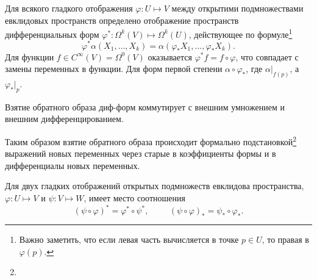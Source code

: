 \begin{to_def} 
    Для всякого гладкого отображения $\varphi \colon U \mapsto V$ между открытими подмножествами евклидовых пространств определено отображение пространств дифференциальных форм $\varphi^* \colon \Omega^k(V) \mapsto \Omega^k (U)$, действующее по формуле\footnote{
        Важно заметить, что если левая часть вычисляется в точке $p \in U$, то правая в $\varphi(p)$.
    }
\begin{equation*}
    \varphi^* \alpha (X_1, \ldots, X_k) = \alpha(\varphi_* X_1,\ldots,\varphi_* X_k).
\end{equation*}
Для функции $f \in C^{\infty}(V) = \Omega^0 (V)$ оказывается $\varphi^* f = f \circ \varphi$, что совпадает с замены переменных в функции. Для форм первой степени $\alpha \circ \varphi_*$, где $\alpha|_{f(p)}$, а $\varphi_*|_p$.
\end{to_def}

\begin{to_lem} 
    Взятие обратного образа диф-форм коммутирует с внешним умножением и внешним дифференцированием.  
\end{to_lem}


Таким образом взятие обратного образа происходит формально подстановкой\footnote{
} выражений новых переменных через старые в коэффициенты формы и в дифференциалы новых переменных.


\begin{to_tas} 
\label{task_6.97}
    Для двух гладких отображений открытых подмножеств евклидова пространства, $\varphi \colon U \mapsto V$ и $\psi \colon V \mapsto W$, имеет место соотношения
    \begin{equation*}
        (\psi \circ \varphi)^* = \varphi^* \circ \psi^*,
        \hspace{1cm} 
        (\psi \circ \varphi)_* = \psi_* \circ \varphi_*.
    \end{equation*}
\end{to_tas}